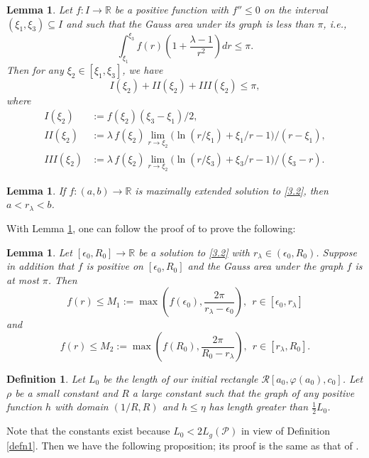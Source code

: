 \documentclass{amsart}
\newtheorem{lem}[theorem]{Lemma}
\theoremstyle{Corollary}
\newtheorem{defn}[theorem]{Definition}
\numberwithin{equation}{section}
\begin{document}
\begin{lem}\label{lem17}
Let $f:I\to\mathbb{R}$ be a positive function with $f''\leq 0$ on the interval $(\xi_1,\xi_3)\subseteq I$ and
such that the Gauss area under its graph is less than $\pi$, i.e.,
$$\int_{\xi_1}^{\xi_3}f(r)\left(1+\frac{\lambda-1}{r^2}\right)dr\leq \pi.$$
Then for any $\xi_2\in[\xi_1,\xi_3]$, we have
$$I(\xi_2)+II(\xi_2)+III(\xi_2)\leq \pi,$$
where
\begin{equation*}
\begin{split}
I(\xi_2)&:=f(\xi_2)(\xi_3-\xi_1)/2,\\
II(\xi_2)&:=\lambda\, f(\xi_2)\lim_{r\to\xi_2}\big(\ln(r/\xi_1)+\xi_1/r-1\big)/(r-\xi_1),\\
III(\xi_2)&:=\lambda\, f(\xi_2)\lim_{r\to\xi_2}\big(\ln(r/\xi_3)+\xi_3/r-1\big)/(\xi_3-r).
\end{split}
\end{equation*}
\end{lem}

\begin{lem}\label{lem18}
If $f:(a,b)\to\mathbb{R}$
is maximally extended solution to \eqref{3.2},
then $a<r_\lambda<b$.
\end{lem}


With Lemma \ref{lem17},
one can follow the proof of \cite[Lemma 19]{Drugan&Nguyen}
to prove the following:

\begin{lem}\label{lem19}
Let $[\epsilon_0,R_0]\to\mathbb{R}$ be a solution to \eqref{3.2}
with $r_\lambda\in (\epsilon_0,R_0)$.
Suppose in addition that $f$ is positive on $[\epsilon_0,R_0]$
and the Gauss area under the graph $f$ is at most $\pi$.
Then
$$f(r)\leq M_1:=\max\left(f(\epsilon_0),\frac{2\pi}{r_\lambda-\epsilon_0}\right),~~r\in [\epsilon_0,r_\lambda]$$
and
$$f(r)\leq M_2:=\max\left(f(R_0),\frac{2\pi}{R_0-r_\lambda}\right),~~r\in [r_\lambda,R_0].$$
\end{lem}

\begin{defn}\label{defn2}
\emph{Let $L_0$ be the length of our initial rectangle $\mathcal{R}[a_0,\varphi(a_0),c_0]$.
Let $\rho$ be a small constant and $R$ a large constant such that
the graph of any positive function $h$ with domain
$(1/R,R)$ and $h\leq \eta$ has length greater than $\frac{1}{2}L_0$.}
\end{defn}

Note that the constants exist because $L_0<2L_g(\mathcal{P})$
 in view of Definition \ref{defn1}.
Then we have the following proposition;
its proof is the same as that of \cite[Proposition 21]{Drugan&Nguyen}.
\end{document}
